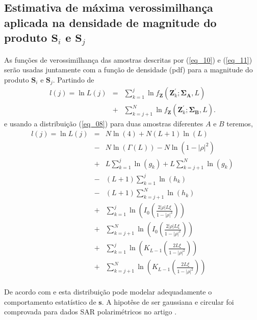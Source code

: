 \subsection{Estimativa de máxima verossimilhança aplicada na densidade de magnitude do produto $\mathbf{S}_i$ e $\mathbf{S}_j$}
As funções de verossimilhança das amostras descritas por (\ref{eq_10}) e (\ref{eq_11}) serão usadas juntamente com a função de densidade (pdf) para a magnitude do produto $\mathbf{S}_i$ e $\mathbf{S}_j$. Partindo de 
\begin{equation*}
\begin{array}{rcl}
	l(j)=\ln L(j)&=&\sum_{k=1}^{j}\ln f_{\mathbf{Z}}(\mathbf{Z}_{k}^{'};\mathbf{\Sigma_{A}},L)\\
	             &+&\sum_{k=j+1}^{N}\ln f_{\mathbf{Z}}(\mathbf{Z}_{k}^{'};\mathbf{\Sigma_{B}},L).
\end{array}
\end{equation*}
e usando a distribuição (\ref{eq_08}) para duas amostras diferentes $A$ e $B$ teremos,
\begin{equation}
\begin{array}{rcl}
	l(j)=\ln L(j)&=&N\ln(4)+N(L+1)\ln(L)\\
	             &-&N\ln(\Gamma(L))-N\ln(1-|\rho|^2)\\
	             &+&L\sum_{k=1}^{j}\ln(g_k)+L\sum_{k=j+1}^{N}\ln(g_k) \\
	             &-&(L+1)\sum_{k=1}^{j}\ln(h_k)\\
	             &-&(L+1)\sum_{k=j+1}^{N}\ln(h_k) \\
	             &+&\sum_{k=1}^{j}\ln \left(I_0\left(\frac{2|\rho|L\xi}{1-|\rho|^2}\right)\right)\\ 
	             &+&\sum_{k=j+1}^{N} \ln \left(I_0\left(\frac{2|\rho|L\xi}{1-|\rho|^2}\right)\right)        \\
	             &+&\sum_{k=1}^{j}\ln \left(K_{L-1}\left(\frac{2L\xi}{1-|\rho|^2}\right)\right)\\
	             &+&\sum_{k=j+1}^{N}\ln \left( K_{L-1}\left(\frac{2L\xi}{1-|\rho|^2}\right)\right)         \\
	             
\end{array}
\end{equation}





De acordo com \citet{good} e \citet{lee} esta distribuição pode modelar adequadamente o comportamento estatístico de $\mathbf{s}$. A hipotêse de ser gaussiana e circular foi comprovada para dados SAR polarimétricos no artigo \citet{sarabendi}.   

